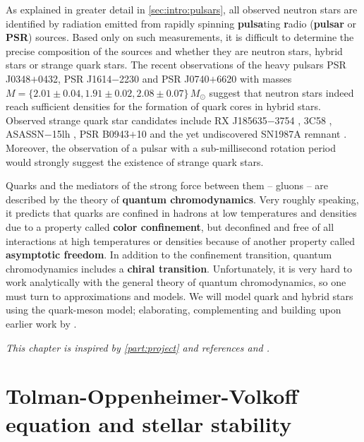 As explained in greater detail in \cref{sec:intro:pulsars},
all observed neutron stars are identified by radiation emitted from rapidly spinning \textbf{pulsa}ting \textbf{r}adio (\textbf{pulsar} or \textbf{PSR}) sources.
Based only on such measurements, it is difficult to determine the precise composition of the sources and whether they are neutron stars, hybrid stars or strange quark stars.
The recent observations \cite{ref:antoniadis,ref:arzoumanian,ref:fonseca}
of the heavy pulsars PSR J0348$+$0432, PSR J1614$-$2230 and PSR J0740$+$6620
with masses $M = \{2.01 \pm 0.04, 1.91 \pm 0.02, 2.08 \pm 0.07\} \, M_\odot$ 
suggest that neutron stars indeed reach sufficient densities for the formation of quark cores in hybrid stars.
Observed strange quark star candidates include 
RX J185635$-$3754 \cite{ref:RXJ1856}, 
3C58 \cite{ref:3c58}, 
ASASSN$-$15lh \cite{ref:ASASSN}, 
PSR B0943$+$10 \cite{ref:PSRB0943}
and the yet undiscovered SN1987A remnant \cite{ref:SN1987A_1,ref:SN1987A_2}.
Moreover, the observation of a pulsar with a sub-millisecond rotation period would strongly suggest the existence of strange quark stars. \cite{ref:glendenning} %

Quarks and the mediators of the strong force between them -- gluons -- are described by the theory of \textbf{quantum chromodynamics}.
Very roughly speaking, it predicts that quarks are confined in hadrons at low temperatures and densities due to a property called \textbf{color confinement},
but deconfined and free of all interactions at high temperatures or densities because of another property called \textbf{asymptotic freedom}.
In addition to the confinement transition, quantum chromodynamics includes a \textbf{chiral transition}.
Unfortunately, it is very hard to work analytically with the general theory of quantum chromodynamics,
so one must turn to approximations and models.
We will model quark and hybrid stars using the quark-meson model;
elaborating, complementing and building upon earlier work by \cite{ref:master_berge}.

\textit{This chapter is inspired by \cref{part:project} and references \cite{ref:glendenning} and \cite{ref:schwartz}.}

\section{Tolman-Oppenheimer-Volkoff equation and stellar stability}
\label{sec:master_intro:tov}

